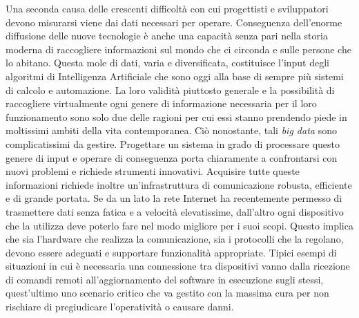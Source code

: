 Una seconda causa delle crescenti difficoltà con cui progettisti e sviluppatori devono misurarsi viene dai dati necessari per operare. Conseguenza dell'enorme diffusione delle nuove tecnologie è anche una capacità senza pari nella storia moderna di raccogliere informazioni sul mondo che ci circonda e sulle persone che lo abitano. Questa mole di dati, varia e diversificata, costituisce l'input degli algoritmi di Intelligenza Artificiale che sono oggi alla base di sempre più sistemi di calcolo e automazione. La loro validità piuttosto generale e la possibilità di raccogliere virtualmente ogni genere di informazione necessaria per il loro funzionamento sono solo due delle ragioni per cui essi stanno prendendo piede in moltissimi ambiti della vita contemporanea. Ciò nonostante, tali \emph{big data} sono complicatissimi da gestire. Progettare un sistema in grado di processare questo genere di input e operare di conseguenza porta chiaramente a confrontarsi con nuovi problemi e richiede strumenti innovativi. Acquisire tutte queste informazioni richiede inoltre un'infrastruttura di comunicazione robusta, efficiente e di grande portata. Se da un lato la rete Internet ha recentemente permesso di trasmettere dati senza fatica e a velocità elevatissime, dall'altro ogni dispositivo che la utilizza deve poterlo fare nel modo migliore per i suoi scopi. Questo implica che sia l'hardware che realizza la comunicazione, sia i protocolli che la regolano, devono essere adeguati e supportare funzionalità appropriate. Tipici esempi di situazioni in cui è necessaria una connessione tra dispositivi vanno dalla ricezione di comandi remoti all'aggiornamento del software in esecuzione sugli stessi, quest'ultimo uno scenario critico che va gestito con la massima cura per non rischiare di pregiudicare l'operatività o causare danni.\newpage
